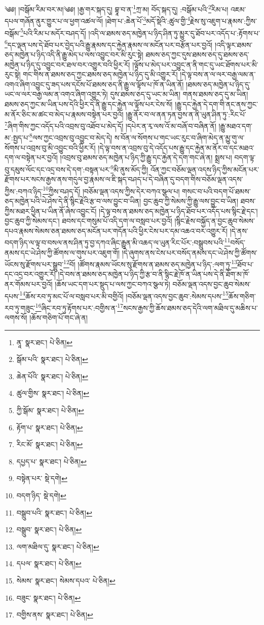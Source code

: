 \setcounter{footnote}{0} 
༄༅། །བསྒོམ་རིམ་བར་མ།༄༅། །རྒྱ་གར་སྐད་དུ། བྷཱ་བ་ན་\footnote{ནཱ་  སྣར་ཐང་།  པེ་ཅིན། }ཀྲ་མ། བོད་སྐད་དུ། :བསྒོམ་པའི་\footnote{སྒོམ་པའི་  སྣར་ཐང་།  པེ་ཅིན། }རིམ་པ། འཇམ་དཔལ་གཞོན་ནུར་གྱུར་པ་ལ་ཕྱག་འཚལ་ལོ། །ཐེག་པ་:ཆེན་པོ་\footnote{ཆེན་པོའི་  སྣར་ཐང་།  པེ་ཅིན། }མདོ་སྡེའི་:ཚུལ་གྱི་\footnote{ཚུལ་གྱིས་  སྣར་ཐང་།  པེ་ཅིན། }རྗེས་སུ་འཇུག་པ་རྣམས་:ཀྱིས་བསྒོམ་\footnote{ཀྱི་སྒོམ་  སྣར་ཐང་།  པེ་ཅིན། }པའི་རིམ་པ་མདོར་བཤད་དོ། །འདི་ལ་ཐམས་ཅད་མཁྱེན་པ་ཉིད་ཤིན་ཏུ་མྱུར་དུ་ཐོབ་པར་འདོད་པ་:རྟོགས་པ་\footnote{རྟོག་པ་  སྣར་ཐང་།  པེ་ཅིན། }དང་ལྡན་པས་དེ་ཐོབ་པར་བྱེད་པའི་རྒྱུ་རྣམས་དང་རྐྱེན་རྣམས་ལ་མངོན་པར་བརྩོན་པར་བྱའོ། །འདི་ལྟར་ཐམས་ཅད་མཁྱེན་པ་ཉིད་འདི་ནི་རྒྱུ་མེད་པ་ལས་འབྱུང་བར་མི་རུང་སྟེ། ཐམས་ཅད་ཀྱང་དུས་ཐམས་ཅད་དུ་ཐམས་ཅད་མཁྱེན་པ་ཉིད་དུ་འབྱུང་བར་ཐལ་བར་འགྱུར་བའི་ཕྱིར་རོ། །ལྟོས་པ་མེད་པར་འབྱུང་ན་ནི་གང་དུ་ཡང་ཐོགས་པར་མི་རུང་སྟེ། གང་གིས་ན་ཐམས་ཅད་ཀྱང་ཐམས་ཅད་མཁྱེན་པ་ཉིད་དུ་མི་འགྱུར་རོ། །དེ་ལྟ་བས་ན་ལ་ལར་བརྒྱ་ལམ་ན་འགའ་ཞིག་འབྱུང་དུ་ཟད་པས་དངོས་པོ་ཐམས་ཅད་ནི་རྒྱུ་ལ་ལྟོས་པ་ཁོ་ན་ཡིན་ནོ། །ཐམས་ཅད་མཁྱེན་པ་ཉིད་དུ་ཡང་ལ་ལར་བརྒྱ་ལམ་ན་འགའ་ཞིག་འགྱུར་ཏེ། དུས་ཐམས་ཅད་དུ་ཡང་མ་ཡིན། གནས་ཐམས་ཅད་དུ་མ་ཡིན། ཐམས་ཅད་ཀྱང་མ་ཡིན་པས་དེའི་ཕྱིར་དེ་ནི་རྒྱུ་དང་རྐྱེན་ལ་ལྟོས་པར་ངེས་སོ། །རྒྱུ་དང་རྐྱེན་དེ་དག་གི་ནང་ནས་ཀྱང་མ་ནོར་ཅིང་མ་ཚང་བ་མེད་པ་རྣམས་བསྟེན་པར་བྱའོ། །རྒྱུ་ནོར་བ་ལ་ནན་ཏན་བྱས་ན་ནི་ཡུན་ཤིན་ཏུ་:རིང་པོ་\footnote{རིང་མོ་  སྣར་ཐང་།  པེ་ཅིན། }ཞིག་གིས་ཀྱང་འདོད་པའི་འབྲས་བུ་འཐོབ་པ་མེད་དོ། །དཔེར་ན་རྭ་ལས་འོ་མ་བཞོ་བ་བཞིན་ནོ། །རྒྱུ་མཐའ་དག་མ་:སྤྱད་པ་\footnote{དཔྱད་པ་  སྣར་ཐང་།  པེ་ཅིན། }ལས་ཀྱང་འབྲས་བུ་འབྱུང་བ་མེད་དེ། ས་བོན་ལ་སོགས་པ་གང་ཡང་རུང་བ་ཞིག་མེད་ན་མྱུ་གུ་ལ་སོགས་པ་འབྲས་བུ་མི་འབྱུང་བའི་ཕྱིར་རོ། །དེ་ལྟ་བས་ན་འབྲས་བུ་དེ་འདོད་པས་རྒྱུ་དང་རྐྱེན་མ་ནོར་བ་དང་མཐའ་དག་ལ་བསྟེན་པར་བྱའོ། །འབྲས་བུ་ཐམས་ཅད་མཁྱེན་པ་ཉིད་ཀྱི་རྒྱུ་དང་རྐྱེན་དེ་དག་གང་ཞེ་ན། སྨྲས་པ། བདག་ལྟ་བུ་དམུས་ལོང་དང་འདྲ་བས་དེ་དག་:བསྟན་པར་\footnote{བསྟེན་པར་  སྡེ་དགེ། }མི་ནུས་མོད་ཀྱི། འོན་ཀྱང་བཅོམ་ལྡན་འདས་ཉིད་ཀྱིས་མངོན་པར་རྫོགས་པར་སངས་རྒྱས་ནས་གདུལ་བྱ་རྣམས་ལ་ཇི་སྐད་བཤད་པ་དེ་བཞིན་དུ་བདག་གིས་བཅོམ་ལྡན་འདས་ཀྱིས་:བཀའ་ཉིད་\footnote{བདག་ཉིད་  སྡེ་དགེ། }ཀྱིས་བཤད་དོ། །བཅོམ་ལྡན་འདས་ཀྱིས་དེར་བཀའ་སྩལ་པ། གསང་བ་པའི་བདག་པོ་ཐམས་ཅད་མཁྱེན་པའི་ཡེ་ཤེས་དེ་ནི་སྙིང་རྗེའི་རྩ་བ་ལས་བྱུང་བ་ཡིན། བྱང་ཆུབ་ཀྱི་སེམས་ཀྱི་རྒྱུ་ལས་བྱུང་བ་ཡིན། ཐབས་ཀྱིས་མཐར་ཕྱིན་པ་ཡིན་ནོ་ཞེས་འབྱུང་ངོ། །དེ་ལྟ་བས་ན་ཐམས་ཅད་མཁྱེན་པ་ཉིད་ཐོབ་པར་འདོད་པས་སྙིང་རྗེ་དང་། བྱང་ཆུབ་ཀྱི་སེམས་དང་། ཐབས་དང་གསུམ་པོ་འདི་དག་ལ་བསླབ་པར་བྱའོ། །སྙིང་རྗེས་བསྐྱོད་ན་བྱང་ཆུབ་སེམས་དཔའ་རྣམས་སེམས་ཅན་ཐམས་ཅད་མངོན་པར་གདོན་པའི་ཕྱིར་ངེས་པར་དམ་འཆའ་བར་འགྱུར་རོ། །དེ་ནས་བདག་ཉིད་ལ་ལྟ་བ་བསལ་ནས་ཤིན་ཏུ་བྱ་དཀའ་ཞིང་རྒྱུན་མི་འཆད་ལ་ཡུན་རིང་པོར་:བསྒྲུབས་པའི་\footnote{བསྒྲུབ་པའི་  སྣར་ཐང་།  པེ་ཅིན། }བསོད་ནམས་དང་ཡེ་ཤེས་ཀྱི་ཚོགས་ལ་གུས་པར་འཇུག་གོ། །དེ་ཞུགས་ནས་ངེས་པར་བསོད་ནམས་དང་ཡེ་ཤེས་ཀྱི་ཚོགས་ཡོངས་སུ་རྫོགས་པར་སྒྲུབ་\footnote{བསྒྲུབ་  སྣར་ཐང་།  པེ་ཅིན། }བོ། །ཚོགས་རྣམས་ཡོངས་སུ་རྫོགས་ན་ཐམས་ཅད་མཁྱེན་པ་ཉིད་:ལག་ཏུ་\footnote{ལག་མཐིལ་དུ་  སྣར་ཐང་།  པེ་ཅིན། }ཐོབ་པ་དང་འདྲ་བར་འགྱུར་རོ། །དེ་བས་ན་ཐམས་ཅད་མཁྱེན་པ་ཉིད་ཀྱི་རྩ་བ་ནི་སྙིང་རྗེ་ཁོ་ན་ཡིན་པས་དེ་ནི་ཐོག་མ་ཁོ་ནར་གོམས་པར་བྱའོ། །ཆོས་ཡང་དག་པར་སྡུད་པ་ལས་ཀྱང་བཀའ་སྩལ་ཏེ། བཅོམ་ལྡན་འདས་བྱང་ཆུབ་སེམས་དཔས་\footnote{དཔལ་  སྣར་ཐང་།  པེ་ཅིན། }ཆོས་རབ་ཏུ་མང་པོ་ལ་བསླབ་པར་མི་བགྱིའོ། །བཅོམ་ལྡན་འདས་བྱང་ཆུབ་:སེམས་དཔས་\footnote{སེམས་  སྣར་ཐང་། སེམས་དཔའ་  པེ་ཅིན། }ཆོས་གཅིག་རབ་ཏུ་གཟུང་\footnote{བཟུང་  སྣར་ཐང་།  པེ་ཅིན། }ཞིང་རབ་ཏུ་རྟོགས་པར་:བགྱིས་ན་\footnote{བགྱིས་ནས་  སྣར་ཐང་།  པེ་ཅིན། }སངས་རྒྱས་ཀྱི་ཆོས་ཐམས་ཅད་དེའི་ལག་མཐིལ་དུ་མཆིས་པ་ལགས་སོ། །ཆོས་གཅིག་པོ་གང་ཞེ་ན། 